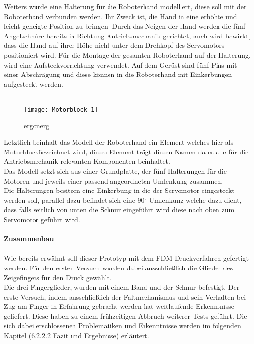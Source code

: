 \documentclass[titlepage,12pt,twoside]{article}
\begin{document}
\hfill \break
Weiters wurde eine Halterung für die Roboterhand modelliert, diese soll mit 
der Roboterhand verbunden werden. Ihr Zweck ist, die Hand in eine erhöhte und 
leicht geneigte Position zu bringen. Durch das Neigen der Hand werden die fünf 
Angelschnüre bereits in Richtung Antriebsmechanik gerichtet, auch wird bewirkt, 
dass die Hand auf ihrer Höhe nicht unter dem Drehkopf des Servomotors positioniert 
wird. Für die Montage der gesamten Roboterhand auf der Halterung, wird eine 
Aufsteckvorrichtung verwendet. Auf dem Gerüst sind fünf Pins mit einer 
Abschrägung und diese können in die Roboterhand mit Einkerbungen aufgesteckt 
werden. \\
\\
\begin{figure}[H]
	\begin{center}
		\scalebox{1}
		{\texttt{[image: Motorblock\_1]}}
		\caption{ergonerg}
		\label{fig:Motorblock_1}			
	\end{center}
\end{figure}
\hfill \break
Letztlich beinhalt das Modell der Roboterhand ein Element welches hier als 
\"Motorblock\" bezeichnet wird, dieses Element trägt diesen Namen da es alle 
für die Antriebsmechanik relevanten Komponenten beinhaltet. \\
Das Modell setzt sich aus einer Grundplatte, der fünf Halterungen für die 
Motoren und jeweils einer passend angeordneten Umlenkung zusammen. \\
Die Halterungen besitzen eine Einkerbung in die der Servomotor eingesteckt 
werden soll, parallel dazu befindet sich eine 90° Umlenkung welche dazu dient, 
dass falls seitlich von unten die Schnur eingeführt wird diese nach oben zum 
Servomotor geführt wird. \\
\\
\textbf{Zusammenbau} \\
\\
Wie bereits erwähnt soll dieser Prototyp mit dem FDM-Druckverfahren gefertigt 
werden. Für den ersten Versuch wurden dabei ausschließlich die Glieder des 
Zeigefingers für den Druck gewählt. \\
Die drei Fingerglieder, wurden mit einem Band und der Schnur befestigt. 
Der erste Versuch, indem ausschließlich der Faltmechanismus und sein 
Verhalten bei Zug am Finger in Erfahrung gebracht werden hat weitlaufende 
Erkenntnisse geliefert. Diese haben zu einem frühzeitigen Abbruch weiterer 
Tests geführt. Die sich dabei erschlossenen Problematiken und Erkenntnisse 
werden im folgenden Kapitel (6.2.2.2 Fazit und Ergebnisse) erläutert. \\
\\
\end{document}
